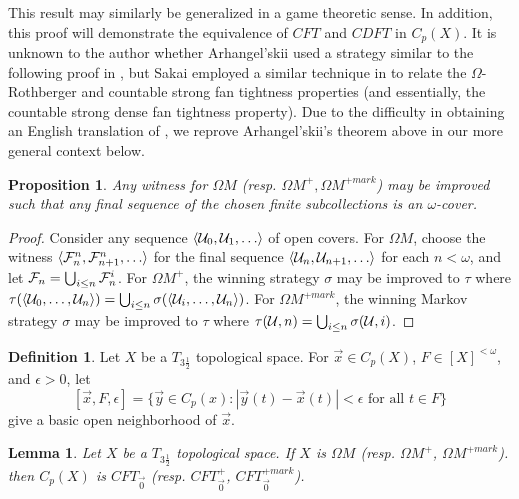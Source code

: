 \documentclass{amsart}
\theoremstyle{plain}
\newtheorem{lemma}[theorem]{Lemma}
\newtheorem{proposition}[theorem]{Proposition}
\theoremstyle{definition}
\newtheorem{definition}[theorem]{Definition}
\theoremstyle{remark}
\theoremstyle{plain}
\theoremstyle{definition}
\theoremstyle{remark}
\begin{document}
This result may similarly be generalized in a game theoretic sense.
In addition, this proof will demonstrate the equivalence of
\(CFT\) and \(CDFT\) in \(C_p(X)\).
It is unknown to the author whether Arhangel'skii
used a strategy similar to the following proof in \cite{MR837289},
but Sakai employed a similar technique
in \cite{MR964873} to relate the \(\Omega\)-Rothberger and
countable strong fan tightness properties
(and essentially, the countable strong dense fan tightness property).
Due to the difficulty in obtaining an English translation of
\cite{MR837289}, we reprove Arhangel'skii's theorem above in our
more general context below.

\begin{proposition}
  Any witness for \(\Omega M\) (resp. \(\Omega M^+,\Omega M^{+mark}\))
  may be improved such that any final sequence of the chosen
  finite subcollections is an \(\omega\)-cover.
\end{proposition}

\begin{proof}
  Consider any sequence \(\<\mc U_0,\mc U_1,\dots\>\) of open covers.
  For \(\Omega M\), choose the witness
  \(\<\mc F_n^n,\mc F_{n+1}^n,\dots\>\) for the final
  sequence \(\<\mc U_n,\mc U_{n+1},\dots\>\) for each \(n<\omega\),
  and let \(\mathcal{F}_n=\bigcup_{i\leq n}\mathcal{F}_n^i\).
  For \(\Omega M^+\), the winning strategy \(\sigma\) may be improved to
  \(\tau\) where
  \(
    \tau(\langle\mathcal{U}_0,\dots,\mathcal{U}_n\rangle)
      =
    \bigcup_{i\leq n}\sigma(\langle\mathcal{U}_i,\dots,\mathcal{U}_n\rangle)
  \). For \(\Omega M^{+mark}\), the winning Markov strategy \(\sigma\) may
  be improved to \(\tau\) where
  \(
    \tau(\mathcal{U},n)
      =
    \bigcup_{i\leq n}\sigma(\mathcal{U},i)
  \).
\end{proof}

\begin{definition}
  Let \(X\) be a \(T_{3\frac{1}{2}}\) topological space.
  For \(\vec x\in C_p(X)\), \(F\in[X]^{<\omega}\), and
  \(\epsilon>0\), let
  \[
    [\vec x,F,\epsilon]
      =
    \{
      \vec y\in C_p(x)
    :
      |\vec y(t)-\vec x(t)|<\epsilon
    \text{ for all }
      t\in F
    \}
  \]
  give a basic open neighborhood of \(\vec x\).
\end{definition}

\begin{lemma}
  Let \(X\) be a \(T_{3\frac{1}{2}}\) topological space.
  If \(X\) is \(\Omega M\)
  (resp. \(\Omega M^+\), \(\Omega M^{+mark}\)).
  then \(C_p(X)\) is \(CFT_{\vec 0}\)
  (resp. \(CFT_{\vec 0}^+\), \(CFT_{\vec 0}^{+mark}\)).
\end{lemma}
\end{document}
